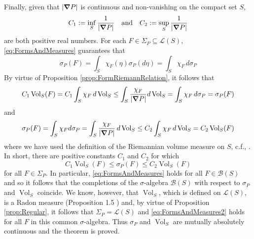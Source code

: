 \documentclass[smallextended]{svjour3}
\theoremstyle{remark}
\renewenvironment{proof}[1][\proofname]{\renewcommand\xproofname{#1}\xproof}{\endxproof}
\newcommand{\Vol}{\operatorname{Vol}}
\begin{document}
\begin{proof}[Proof of Theorem \ref{thm:RiemannLebesgue}]
Finally, given that $\abs{\grad P}$ is continuous and non-vanishing on the compact set $S$,
\begin{equation*}
    C_1 := \inf_S\frac{1}{|\grad P|}\quad\mbox{and}\quad C_2 := \sup_{S}\frac{1}{\abs{\grad P }}
\end{equation*}
are both positive real numbers. For each $F\in \Sigma_P\subseteq\mathcal{L}(S)$, \eqref{eq:FormsAndMeasures} guarantees that
\begin{equation*}
    \sigma_P(F)=\int_S\chi_F(\eta)\sigma_P(d\eta)=\int_S \chi_F\,d\sigma_P
\end{equation*}
By virtue of Proposition \ref{prop:FormRiemannRelation}, it follows that
\begin{equation*}
C_1\Vol_S(F)=C_1\int_S \chi_F\,d\Vol_S\leq \int_S \frac{\chi_F}{|\grad P|}d\Vol_S=\int_S \chi_F\,d\sigma_P=\sigma_P(F)
\end{equation*}
and
\begin{equation*}
    \sigma_P(F)=\int_S\chi_F d\sigma_P=\int_S\frac{\chi_F}{|\grad P|}\,d\Vol_S\leq C_2\int_S\chi_F\,d\Vol_S=C_2\Vol_S(F)
\end{equation*}
where we have used the definition of the Riemannian volume measure on $S$, c.f., \cite{amann_analysis_2009}. In short, there are positive constants $C_1$ and $C_2$ for which
\begin{equation}\label{eq:FormsAndMeasures2}
    C_1\Vol_S(F)\leq\sigma_P(F)\leq C_2\Vol_S(F)
\end{equation}
for all $F\in\Sigma_P$. In particular, \eqref{eq:FormsAndMeasures} holds for all $F\in\mathcal{B}(S)$ and so it follows that the completions of the $\sigma$-algebra $\mathcal{B}(S)$ with respect to $\sigma_P$ and $\Vol_S$ coincide. We know, however, that $\Vol_S$, which is defined on $\mathcal{L}(S)$, is a Radon measure (Proposition 1.5 \cite[Chapter XII]{amann_analysis_2009}) and, by virtue of Proposition \ref{prop:Regular}, it follows that $\Sigma_P=\mathcal{L}(S)$ and \eqref{eq:FormsAndMeasures2} holds for all $F$ in this common $\sigma$-algebra. Thus $\sigma_P$ and $\Vol_S$ are mutually absolutely continuous and the theorem is proved.
\end{proof}
\end{document}
